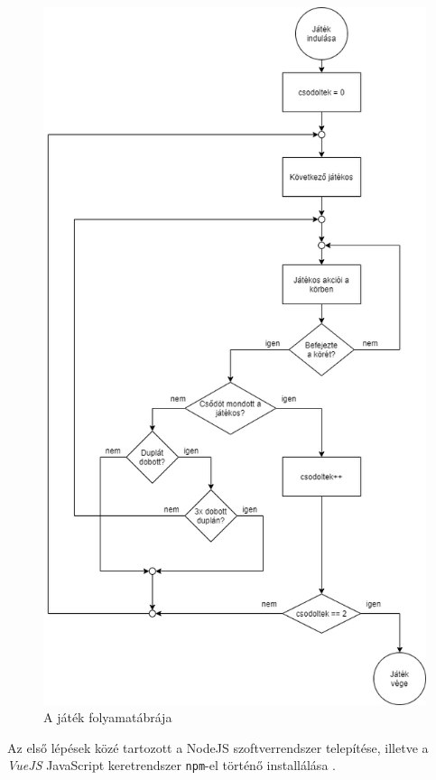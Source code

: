\begin{figure}[h!]
\centering
\includegraphics[scale=0.6]{images/folyamata.png}
\caption{A játék folyamatábrája}
\label{fig:flowchart}
\end{figure}

\newpage
{}

Az első lépések közé tartozott a NodeJS szoftverrendszer telepítése, illetve a \textit{VueJS} JavaScript keretrendszer \texttt{npm}-el történő installálása \cite{cantelon2014node}.

